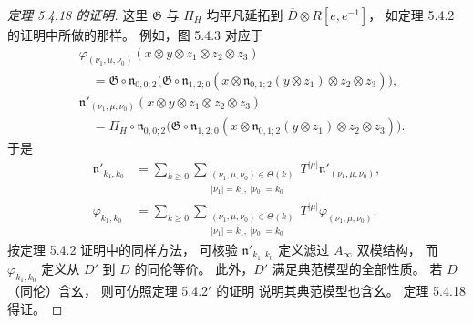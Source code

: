\begin{proof}[定理 5.4.18 的证明]
这里 $\mathfrak G$ 与 $\Pi_H$
均平凡延拓到
$\overline D\otimes R[e,e^{-1}]$，
如定理 5.4.2 的证明中所做的那样。
例如，图 5.4.3 对应于
\[
\begin{aligned}
&\varphi_{(\nu_1,\mu,\nu_0)}
(x\otimes y\otimes z_1\otimes z_2\otimes z_3)\\
&\quad=\mathfrak G\circ\mathfrak n_{0,0;2}
\bigl(\mathfrak G\circ\mathfrak n_{1,2;0}
(x\otimes\mathfrak n_{0,1;2}(y\otimes z_1)
\otimes z_2\otimes z_3)\bigr),\\
&\mathfrak n'_{(\nu_1,\mu,\nu_0)}
(x\otimes y\otimes z_1\otimes z_2\otimes z_3)\\
&\quad=\Pi_H\circ\mathfrak n_{0,0;2}
\bigl(\mathfrak G\circ\mathfrak n_{1,2;0}
(x\otimes\mathfrak n_{0,1;2}(y\otimes z_1)
\otimes z_2\otimes z_3)\bigr).
\end{aligned}
\]
于是
\[
\begin{aligned}
\mathfrak n'_{k_1,k_0}
&=\sum_{k\ge0}
\sum_{\substack{(\nu_1,\mu,\nu_0)\in\Theta(k)\\
|\nu_1|=k_1,\ |\nu_0|=k_0}}
T^{|\mu|}\mathfrak n'_{(\nu_1,\mu,\nu_0)},\\
\varphi_{k_1,k_0}
&=\sum_{k\ge0}
\sum_{\substack{(\nu_1,\mu,\nu_0)\in\Theta(k)\\
|\nu_1|=k_1,\ |\nu_0|=k_0}}
T^{|\mu|}\varphi_{(\nu_1,\mu,\nu_0)}.
\end{aligned}
\]
按定理 5.4.2 证明中的同样方法，
可核验 $\mathfrak n'_{k_1,k_0}$
定义滤过 $A_\infty$ 双模结构，
而 $\varphi_{k_1,k_0}$
定义从 $D'$ 到 $D$ 的同伦等价。
此外，$D'$ 满足典范模型的全部性质。
若 $D$（同伦）含幺，
则可仿照定理 5.4.2$'$ 的证明
说明其典范模型也含幺。
定理 5.4.18 得证。
\end{proof}
